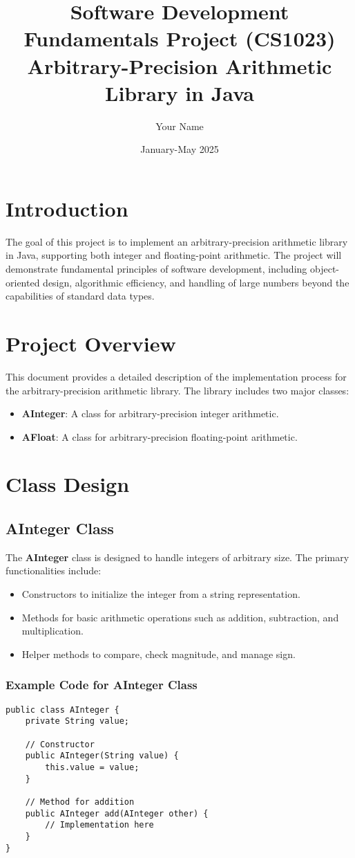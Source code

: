 \documentclass[12pt]{article}
\title{Software Development Fundamentals Project (CS1023)\\
       Arbitrary-Precision Arithmetic Library in Java}
\author{Your Name}
\date{January-May 2025}
\begin{document}
\maketitle

\section*{Introduction}
The goal of this project is to implement an arbitrary-precision arithmetic library in Java, supporting both integer and floating-point arithmetic. The project will demonstrate fundamental principles of software development, including object-oriented design, algorithmic efficiency, and handling of large numbers beyond the capabilities of standard data types.

\section*{Project Overview}
This document provides a detailed description of the implementation process for the arbitrary-precision arithmetic library. The library includes two major classes:
\begin{itemize}
    \item \textbf{AInteger}: A class for arbitrary-precision integer arithmetic.
    \item \textbf{AFloat}: A class for arbitrary-precision floating-point arithmetic.
\end{itemize}

\section*{Class Design}
\subsection*{AInteger Class}
The \textbf{AInteger} class is designed to handle integers of arbitrary size. The primary functionalities include:
\begin{itemize}
    \item Constructors to initialize the integer from a string representation.
    \item Methods for basic arithmetic operations such as addition, subtraction, and multiplication.
    \item Helper methods to compare, check magnitude, and manage sign.
\end{itemize}

\subsubsection*{Example Code for AInteger Class}
\begin{verbatim}
public class AInteger {
    private String value;
    
    // Constructor
    public AInteger(String value) {
        this.value = value;
    }
    
    // Method for addition
    public AInteger add(AInteger other) {
        // Implementation here
    }
}
\end{verbatim}
\end{document}

